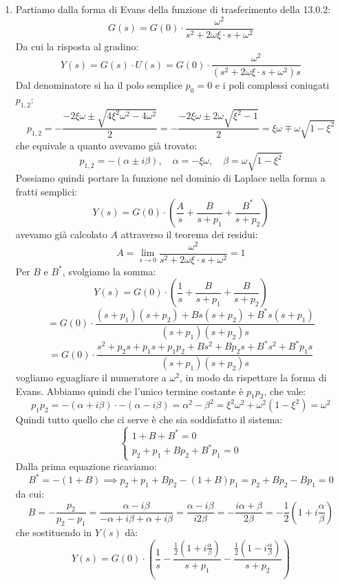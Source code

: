 \documentclass[a4paper,11pt]{article}
\begin{document}
\begin{enumerate}
	\item Partiamo dalla forma di Evans della funzione di trasferimento della 13.0.2:
		$$
		G(s) = G(0) \cdot \frac{\omega^2}{s^2 + 2 \omega \xi \cdot s + \omega^2}
		$$
		Da cui la risposta al gradino:
		$$
		Y(s) = G(s) \cdot U(s) = G(0) \cdot \frac{\omega^2}{\left( s^2 + 2 \omega \xi \cdot s + \omega^2 \right) s}
		$$
		Dal denominatore si ha il polo semplice $p_0 = 0$ e i poli complessi coniugati $p_{1,2}$:
		$$
		p_{1,2} = - \frac{ - 2 \xi \omega \pm \sqrt{4 \xi^2 \omega^2 - 4 \omega^2} }{2} = - \frac{ - 2 \xi \omega \pm 2 \omega \sqrt{\xi^2 - 1} }{2} = \xi \omega \mp \omega \sqrt{1 - \xi^2}
		$$
		che equivale a quanto avevamo già trovato:
		$$
		p_{1, 2} = -(\alpha \pm i \beta), \quad \alpha = -\xi \omega, \quad \beta = \omega \sqrt{1 - \xi^2}
		$$
		Possiamo quindi portare la funzione nel dominio di Laplace nella forma a fratti semplici:
		$$
		Y(s) = G(0) \cdot \left( \frac{A}{s} + \frac{B}{s + p_1} + \frac{B^*}{s + p_2} \right)
		$$
		avevamo già calcolato $A$ attraverso il teorema dei residui:
		$$
		A = \lim_{s \rightarrow 0} \frac{ \omega^2 }{ s^2 + 2 \omega \xi \cdot s + \omega^2 } = 1 
		$$
		Per $B$ e $B^*$, svolgiamo la somma:
		$$
		Y(s) = G(0) \cdot \left( \frac{1}{s} + \frac{B}{s + p_1} + \frac{B}{s + p_2} \right) 
		$$
		$$
		= G(0) \cdot \frac{ (s + p_1)(s + p_2) + Bs(s + p_2) + B^*s(s + p_1) }{(s + p_1)(s + p_2)s}
		$$
		$$
		= G(0) \cdot \frac{ s^2 + p_2 s + p_1 s + p_1 p_2 + Bs^2 + B p_2 s + B^* s^2 + B^* p_1 s }{(s + p_1)(s + p_2)s}
		$$
	vogliamo eguagliare il numeratore a $\omega^2$, in modo da rispettare la forma di Evans.
	Abbiamo quindi che l'unico termine costante è $p_1 p_2$, che vale:
	$$
	p_1 p_2 = -(\alpha + i \beta) \cdot -(\alpha - i \beta) = \alpha^2 - \beta^2 = \xi^2 \omega^2 + \omega^2 (1 - \xi^2) = \omega^2
	$$
	Quindi tutto quello che ci serve è che sia soddisfatto il sistema:
	\[
		\begin{cases}
			1 + B + B^* = 0 \\ 
			p_2 + p_1 + B p_2 + B^* p_1 = 0
		\end{cases}
	\]
	Dalla prima equazione ricaviamo:
	$$
	B^* = - (1 + B) \implies p_2 + p_1 + B p_2 - (1 + B)p_1 = p_2 + B p_2 - B p_1  = 0
	$$
	da cui:
	$$
	B = - \frac{p_2}{p_2 - p_1} = \frac{\alpha - i \beta}{- \alpha + i \beta + \alpha + i \beta} = \frac{\alpha - i \beta}{ i 2 \beta} = - \frac{i\alpha + \beta}{2 \beta} = -\frac{1}{2} \left( 1 + i\frac{\alpha}{\beta} \right) 
	$$
	che sostituendo in $Y(s)$ dà:
	$$
	Y(s) = G(0) \cdot \left( \frac{1}{s} - \frac{ \frac{1}{2} \left( 1 + i \frac{\alpha}{\beta} \right) }{s + p_1} - \frac{ \frac{1}{2} \left( 1 - i \frac{\alpha}{\beta} \right) }{s + p_2} \right)
$$
\end{enumerate}
\end{document}
